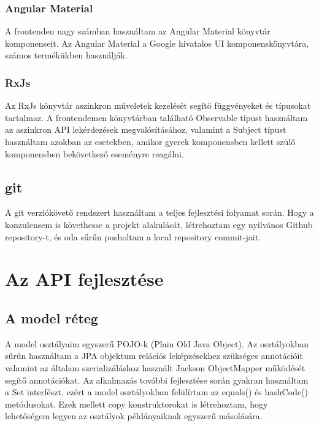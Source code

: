 \documentclass[a4paper,12pt]{report}
\theoremstyle{definition}
\theoremstyle{remark}
\begin{document}
	\subsection{Angular Material}

A frontenden nagy számban használtam az Angular Material\cite{Materialwebsite} könyvtár komponenseit. Az Angular Material a Google hivatalos UI komponenskönyvtára, számos termékükben használják.

	\subsection{RxJs}

Az RxJs\cite{Rxjswebsite} könyvtár aszinkron műveletek kezelését segítő függvényeket és típusokat tartalmaz. A frontendemen könyvtárban található Observable típust használtam az aszinkron API lekérdezések megvalósításához, valamint a Subject típust használtam azokban az esetekben, amikor gyerek komponensben kellett szülő komponensben bekövetkező eseményre reagálni.

\section{git}

A git\cite{Gitwebsite} verziókövető rendszert használtam a teljes fejlesztési folyamat során. Hogy a konzulensem is követhesse a projekt alakulását, létrehoztam egy nyilvános Github\cite{GitHubwebsite} repository-t, és oda sűrűn pusholtam a local repository commit-jait.


\chapter{Az API fejlesztése}

\section{A model réteg}

A model osztályaim egyszerű POJO-k (Plain Old Java Object). Az osztályokban sűrűn használtam a JPA objektum relációs leképzésekhez szükséges annotációit valamint az általam szerializáláshoz használt Jackson ObjectMapper működését segítő annotációkat. Az alkalmazás további fejlesztése során gyakran használtam a Set interfészt, ezért a model osztályokban felülírtam az equals() és hashCode() metódusokat. Ezek mellett copy konstruktorokat is létrehoztam, hogy lehetőségem legyen az osztályok példányaiknak egyszerű másolására.
\end{document}
